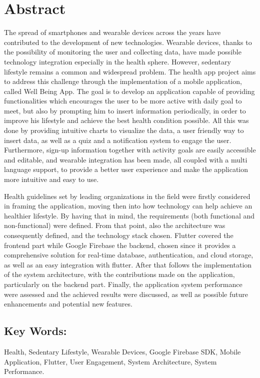 \section*{Abstract}

The spread of smartphones and wearable devices across the years have contributed to the development of new technologies. Wearable devices, thanks to the possibility of monitoring the user and collecting data, have made possible technology integration especially in the health sphere. However, sedentary lifestyle remains a common and widespread problem. The health app project aims to address this challenge through the implementation of a mobile application, called Well Being App. The goal is to develop an application capable of providing functionalities which encourages the user to be more active with daily goal to meet, but also by prompting him to insert information periodically, in order to improve his lifestyle and achieve the best health condition possible. All this was done by providing intuitive charts to visualize the data, a user friendly way to insert data, as well as a quiz and a notification system to engage the user. Furthermore, sign-up information together with activity goals are easily accessible and editable, and wearable integration has been made, all coupled with a multi language support, to provide a better user experience and make the application more intuitive and easy to use.

\noindent Health guidelines set by leading organizations in the field were firstly considered in framing the application, moving then into how technology can help achieve an healthier lifestyle. By having that in mind, the requirements (both functional and non-functional) were defined. From that point, also the architecture was consequently defined, and the technology stack chosen. Flutter covered the frontend part while Google Firebase the backend, chosen since it provides a comprehensive solution for real-time database, authentication, and cloud storage, as well as an easy integration with flutter. After that follows the implementation of the system architecture, with the contributions made on the application, particularly on the backend part. Finally, the application system performance were assessed and the achieved results were discussed, as well as possible future enhancements and potential new features. 

\subsection*{Key Words:}

Health, Sedentary Lifestyle, Wearable Devices, Google Firebase SDK, Mobile Application, Flutter, User Engagement, System Architecture, System Performance.
\newpage